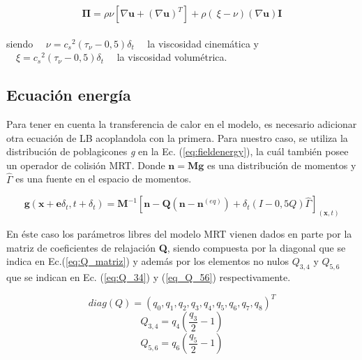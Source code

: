 \begin{equation}
	\mathbf{\Pi} = \rho \nu \left[	\nabla \mathbf{u} + {\left(\nabla \mathbf{u}\right)}^{T}\right] + \rho \left(\ \xi - \nu \right) \left( \nabla \mathbf{u}\right) \mathbf{I}
\end{equation}
\\
siendo $\quad\nu = {c_{s}}^{2} (\tau_{\nu}- 0,5) \delta_{t}\quad$ la viscosidad cinemática y $\quad\xi = {c_{s}}^{2} (\tau_{\nu}- 0,5) \delta_{t}\quad$ la viscosidad volumétrica.



\subsection{Ecuación energía}

Para tener en cuenta la transferencia de calor en el modelo, es necesario adicionar otra ecuación de LB acoplandola con la primera\cite{li2013lattice}. Para nuestro caso, se utiliza la distribución de poblagicones \textit{g} en la Ec. (\ref{eq:fieldenergy}), la cuál también posee un operador de colisión MRT. Donde $\mathbf{n} = \mathbf{M} \mathbf{g}$ es una distribución de momentos y $\hat{\Gamma}$ es una fuente en el espacio de momentos.


\begin{equation}
    \mathbf{g}(\mathbf{x} + \mathbf{e} \delta_{t} ,t + \delta_{t}) = \mathbf{M}^{-1} \left[ \mathbf{n} - \mathbf{Q}(\mathbf{n} - \mathbf{n}^{(eq)}) + \delta_{t} \left( I - 0,5 Q \right) \hat{\Gamma}  \right]_{(\mathbf{x},t)}
    \label{eq:fieldenergy}
\end{equation}

En éste caso los parámetros libres del modelo MRT vienen dados en parte por la matriz de coeficientes de relajación \textbf{Q}, siendo compuesta por la diagonal que se indica en Ec.(\ref{eq:Q_matriz}) y además por los elementos no nulos $Q_{3,4}$ y $ Q_{5,6}$ que se indican en Ec. (\ref{eq:Q_34}) y (\ref{eq_Q_56})  respectivamente.

\begin{equation}
    \textit{diag} (Q) = {( q_{0} , q_{1} , q_{2} , q_{3} , q_{4} , q_{5} , q_{6} , q_{7} , q_{8} )}^{T}
    \label{eq:Q_matriz}
\end{equation}
\begin{equation}
    Q_{3,4} = q_{4} \left( \frac{q_{3}}{2} - 1 \right)
    \label{eq:Q_34}
\end{equation}
\begin{equation}
    Q_{5,6} = q_{6} \left( \frac{q_{5}}{2} - 1 \right)
    \label{eq_Q_56}
\end{equation}

